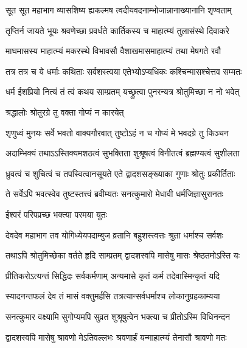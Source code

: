 


\twolineshloka
{सूत सूत महाभाग व्यासशिष्य ह्यकल्मष}
{त्वदीयवदनाम्भोजान्नानाख्यानानि शृण्वताम्} %

\twolineshloka
{तृप्तिर्न जायते भूयः श्रवणेच्छा प्रवर्धते}
{कार्तिकस्य च माहात्म्यं तुलासंस्थे दिवाकरे} %

\twolineshloka
{माघमासस्य माहात्म्यं मकरस्थे विभावसौ}
{वैशाखमासमाहात्म्यं तथा मेषगते रवौ} %

\twolineshloka
{तत्र तत्र च ये धर्माः कथिताः सर्वशस्त्वया}
{एतेभ्योऽप्यधिकः कश्चिन्मासश्चेत्तव सम्मतः} %

\twolineshloka
{धर्म ईशप्रियो नित्यं तं त्वं कथय साम्प्रतम्}
{यच्छ्रुत्वा पुनरन्यत्र श्रोतुमिच्छा न नो भवेत्} %

\onelineshloka
{श्रद्धालोः श्रोतुरग्रे तु वक्ता गोप्यं न कारयेत्} %


\twolineshloka
{शृणुध्वं मुनयः सर्वे भवतो वाक्यगौरवात्}
{तुष्टोऽहं न च गोप्यं मे भवदग्रे तु किञ्चन} %

\twolineshloka
{अदाम्भिक्यं तथाऽऽस्तिक्यमशठत्वं सुभक्तिता}
{शुश्रूषत्वं विनीतत्वं ब्रह्मण्यत्वं सुशीलता} %

\twolineshloka
{ध्रुवत्वं च शुचित्वं च तपस्वित्वानसूयते}
{एते द्वादशसङ्ख्याका गुणाः श्रोतुः प्रकीर्तिताः} %

\twolineshloka
{ते सर्वेऽपि भवत्स्वेव तुष्टस्तत्त्वं ब्रवीम्यतः}
{सनत्कुमारो मेधावी धर्मजिज्ञासुरानतः} %

\onelineshloka
{ईश्वरं परिपप्रच्छ भक्त्या परमया युतः} %


\twolineshloka
{देवदेव महाभाग तव योगिध्येयपदाम्बुज}
{व्रतानि बहुशस्त्वत्तः श्रुता धर्माश्च सर्वशः} %

\twolineshloka
{तथाऽपि श्रोतुमिच्छेका वर्तते हृदि साम्प्रतम्}
{द्वादशस्वपि मासेषु मासः श्रेष्ठतमोऽस्ति यः} %

\twolineshloka
{प्रीतिकरोऽत्यन्तं सिद्धिदः सर्वकर्मणाम्}
{अन्यमासे कृतं कर्म तदेवास्मिन्कृतं यदि} %

\twolineshloka
{स्यादनन्तफलं देव तं मासं वक्तुमर्हसि}
{तत्रत्यान्सर्वधर्माश्च लोकानुग्रहकाम्यया} %


\twolineshloka
{सनत्कुमार वक्ष्यामि सुगोप्यमपि सुव्रत}
{शुश्रूषुत्वेन भक्त्या च प्रीतोऽस्मि विधिनन्दन} %

\twolineshloka
{द्वादशस्वपि मासेषु श्रावणो मेऽतिवल्लभः}
{श्रवणार्हं यन्माहात्म्यं तेनासौ श्रावणो मतः} %

